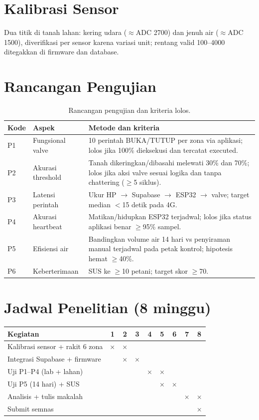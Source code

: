 \documentclass[12pt,a4paper,oneside]{report}
\begin{document}
\section{Kalibrasi Sensor}
Dua titik di tanah lahan: kering udara ($\approx$ADC 2700) dan jenuh air ($\approx$ADC 1500), diverifikasi per sensor karena variasi unit; rentang valid 100--4000 ditegakkan di firmware dan database.

\section{Rancangan Pengujian}
\begin{table}[h]
\centering
\caption{Rancangan pengujian dan kriteria lolos.}
\begin{tabularx}{\textwidth}{llX}
\toprule
Kode & Aspek & Metode dan kriteria \\
\midrule
P1 & Fungsional valve & 10 perintah BUKA/TUTUP per zona via aplikasi; lolos jika 100\% dieksekusi dan tercatat executed. \\
P2 & Akurasi threshold & Tanah dikeringkan/dibasahi melewati 30\% dan 70\%; lolos jika aksi valve sesuai logika dan tanpa chattering ($\geq$5 siklus). \\
P3 & Latensi perintah & Ukur HP $\rightarrow$ Supabase $\rightarrow$ ESP32 $\rightarrow$ valve; target median $<$15 detik pada 4G. \\
P4 & Akurasi heartbeat & Matikan/hidupkan ESP32 terjadwal; lolos jika status aplikasi benar $\geq$95\% sampel. \\
P5 & Efisiensi air & Bandingkan volume air 14 hari vs penyiraman manual terjadwal pada petak kontrol; hipotesis hemat $\geq$40\%. \\
P6 & Keberterimaan & SUS ke $\geq$10 petani; target skor $\geq$70. \\
\bottomrule
\end{tabularx}
\end{table}

\section{Jadwal Penelitian (8 minggu)}
\begin{table}[h]
\centering
\begin{tabularx}{\textwidth}{Xcccccccc}
\toprule
Kegiatan & 1 & 2 & 3 & 4 & 5 & 6 & 7 & 8 \\
\midrule
Kalibrasi sensor + rakit 6 zona & $\times$ & $\times$ & & & & & & \\
Integrasi Supabase + firmware & & $\times$ & $\times$ & & & & & \\
Uji P1--P4 (lab + lahan) & & & & $\times$ & $\times$ & & & \\
Uji P5 (14 hari) + SUS & & & & & $\times$ & $\times$ & & \\
Analisis + tulis makalah & & & & & & & $\times$ & $\times$ \\
Submit semnas & & & & & & & & $\times$ \\
\bottomrule
\end{tabularx}
\end{table}
\end{document}
